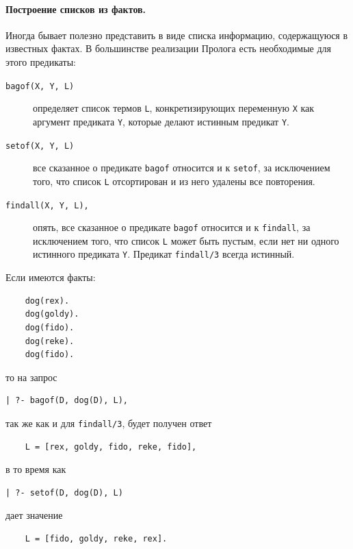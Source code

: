 \documentclass[12pt, openany, twoside]{book} %
\begin{document}
\paragraph{Построение списков из фактов.} Иногда бывает полезно представить в виде списка информацию, содержащуюся в известных фактах. В большинстве реализации Пролога есть необходимые для этого предикаты:
\begin{description}
\item[\normalfont\tt bagof(X, Y, L)] определяет список термов {\tt L}, конкретизирующих переменную {\tt Х} как аргумент предиката {\tt Y}, которые делают истинным предикат {\tt Y}.

\item[\normalfont\tt setof(X, Y, L)] все сказанное о предикате {\tt bagof} относится и к {\tt setof}, за исключением того, что список {\tt L} отсортирован и из него удалены все повторения.

\item[\normalfont\tt findall(X, Y, L),] опять, все сказанное о предикате {\tt bagof} относится и к {\tt findall}, за исключением того, что список {\tt L} может быть пустым, если нет ни одного истинного предиката {\tt Y}. Предикат {\tt findall/3} всегда истинный.
\end{description}

Если имеются факты:

{\tt\begin{verbatim}
    dog(rex).
    dog(goldy).
    dog(fido).
    dog(reke).
    dog(fido).
\end{verbatim}}

\noindent то на запрос

{\tt\begin{verbatim}
| ?- bagof(D, dog(D), L),
\end{verbatim}}

\noindent так же как и для {\tt findall/3}, будет получен ответ
{\tt\begin{verbatim}
    L = [rex, goldy, fido, reke, fido],
\end{verbatim}}

\noindent в то время как

{\tt\begin{verbatim}
| ?- setof(D, dog(D), L)
\end{verbatim}}

\noindent дает значение
{\tt\begin{verbatim}
    L = [fido, goldy, reke, rex].
\end{verbatim}}
\end{document}
